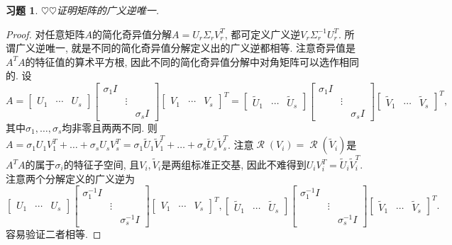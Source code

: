 \documentclass{ctexart}
\newtheorem{exercise}[thm]{习题}
\newcommand\hint[1]{\par {\footnotesize\kaishu 提示：#1}}
\def\hard{$\heartsuit$}
\def\wtd{\widetilde}
\DeclareMathOperator{\range}{\mathcal{R}}
\begin{document}
\begin{exercise}
\hard\hard 证明矩阵的广义逆唯一. 

\end{exercise}
\begin{proof}
	对任意矩阵$A$的简化奇异值分解$A=U_r\Sigma_rV_r^T$, 都可定义广义逆$V_r\Sigma_r^{-1}U_r^T$. 所谓广义逆唯一, 就是不同的简化奇异值分解定义出的广义逆都相等. 
注意奇异值是$A^TA$的特征值的算术平方根, 因此不同的简化奇异值分解中对角矩阵可以选作相同的. 
设
\[
	A=\begin{bmatrix}
	U_1 & \cdots & U_s
\end{bmatrix}\begin{bmatrix}
\sigma_1I\\ & \vdots \\ && \sigma_sI
\end{bmatrix}\begin{bmatrix}
V_1 & \cdots &V_s
\end{bmatrix}^T
=\begin{bmatrix}
	\wtd U_1 & \cdots & \wtd U_s
\end{bmatrix}\begin{bmatrix}
\sigma_1I\\ & \vdots \\ && \sigma_sI
\end{bmatrix}\begin{bmatrix}
\wtd V_1 & \cdots &\wtd V_s
\end{bmatrix}^T,
\]
其中$\sigma_1,\dots,\sigma_s$均非零且两两不同. 
则$A=\sigma_1U_1V_1^T+\dots+\sigma_sU_sV_s^T=\sigma_1\wtd U_1\wtd V_1^T+\dots+\sigma_s\wtd U_s\wtd V_s^T$. 
注意$\range(V_i)=\range(\wtd V_i)$是$A^TA$的属于$\sigma_i$的特征子空间, 且$V_i,\wtd V_i$是两组标准正交基, 
因此不难得到$U_iV_i^T=\wtd U_i\wtd  V_i^T$. 
注意两个分解定义的广义逆为
\[
	\begin{bmatrix}
	U_1 & \cdots & U_s
\end{bmatrix}\begin{bmatrix}
\sigma_1^{-1}I\\ & \vdots \\ && \sigma_s^{-1}I
\end{bmatrix}\begin{bmatrix}
V_1 & \cdots &V_s
\end{bmatrix}^T,
\begin{bmatrix}
	\wtd U_1 & \cdots & \wtd U_s
\end{bmatrix}\begin{bmatrix}
\sigma_1^{-1}I\\ & \vdots \\ && \sigma_s^{-1}I
\end{bmatrix}\begin{bmatrix}
\wtd V_1 & \cdots &\wtd V_s
\end{bmatrix}^T
.
\]
容易验证二者相等. 
\end{proof}
\end{document}
